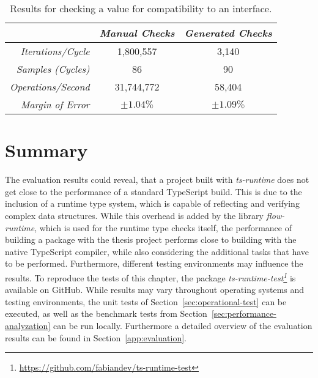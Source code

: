 \begin{table}[ht]
\begin{subtable}[ht]{1.0\textwidth}
  \end{subtable}
  \begin{subtable}[ht]{1.0\textwidth}
    \setlength{\tabcolsep}{5mm}
    \def\arraystretch{1.25}
    \centering
    \begin{tabular}{|r||c|c|}
      \hline
      & \emph{Manual Checks} & \emph{Generated Checks} \\
      \hline
      \hline
      \emph{Iterations/Cycle} & 1,800,557 & 3,140 \\
      \hline
      \emph{Samples (Cycles)} & 86 & 90 \\
      \hline
      \emph{Operations/Second} & 31,744,772 & 58,404 \\
      \hline
      \emph{Margin of Error} & $\pm 1.04\%$ & $\pm 1.09\%$ \\
      \hline
    \end{tabular}
    \caption{Results for checking a value for compatibility to an interface.}
    \label{tab:benchmarks:interface}
  \end{subtable}
\end{table}

\section{Summary}
\label{sec:evaluation-summary}

The evaluation results could reveal, that a project built with \emph{ts-runtime} does not get close to the performance of a standard TypeScript build. This is due to the inclusion of a runtime type system, which is capable of reflecting and verifying complex data structures. While this overhead is added by the library \emph{flow-runtime}, which is used for the runtime type checks itself, the performance of building a package with the thesis project performs close to building with the native TypeScript compiler, while also considering the additional tasks that have to be performed. Furthermore, different testing environments may influence the results. To reproduce the tests of this chapter, the package \emph{ts-runtime-test\footnote{\url{https://github.com/fabiandev/ts-runtime-test}}} is available on GitHub. While results may vary throughout operating systems and testing environments, the unit tests of Section~\ref{sec:operational-test} can be executed, as well as the benchmark tests from Section~\ref{sec:performance-analyzation} can be run locally. Furthermore a detailed overview of the evaluation results can be found in Section~\ref{app:evaluation}.
